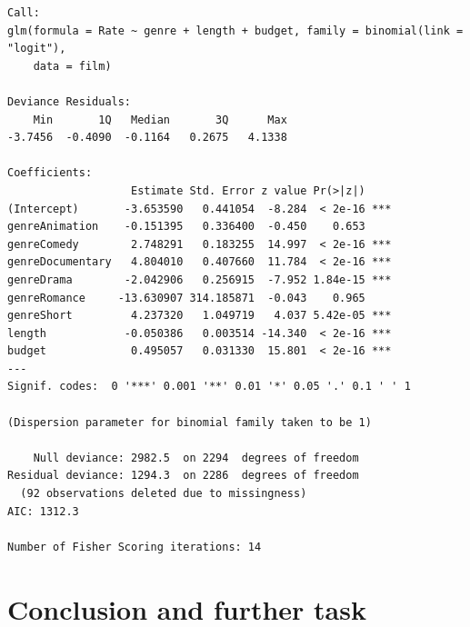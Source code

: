 \documentclass[
]{article}
\begin{document}
\begin{verbatim}
Call:
glm(formula = Rate ~ genre + length + budget, family = binomial(link = "logit"), 
    data = film)

Deviance Residuals: 
    Min       1Q   Median       3Q      Max  
-3.7456  -0.4090  -0.1164   0.2675   4.1338  

Coefficients:
                   Estimate Std. Error z value Pr(>|z|)    
(Intercept)       -3.653590   0.441054  -8.284  < 2e-16 ***
genreAnimation    -0.151395   0.336400  -0.450    0.653    
genreComedy        2.748291   0.183255  14.997  < 2e-16 ***
genreDocumentary   4.804010   0.407660  11.784  < 2e-16 ***
genreDrama        -2.042906   0.256915  -7.952 1.84e-15 ***
genreRomance     -13.630907 314.185871  -0.043    0.965    
genreShort         4.237320   1.049719   4.037 5.42e-05 ***
length            -0.050386   0.003514 -14.340  < 2e-16 ***
budget             0.495057   0.031330  15.801  < 2e-16 ***
---
Signif. codes:  0 '***' 0.001 '**' 0.01 '*' 0.05 '.' 0.1 ' ' 1

(Dispersion parameter for binomial family taken to be 1)

    Null deviance: 2982.5  on 2294  degrees of freedom
Residual deviance: 1294.3  on 2286  degrees of freedom
  (92 observations deleted due to missingness)
AIC: 1312.3

Number of Fisher Scoring iterations: 14
\end{verbatim}

\hypertarget{sec:Conclude}{%
\section{Conclusion and further task}\label{sec:Conclude}}
\end{document}
